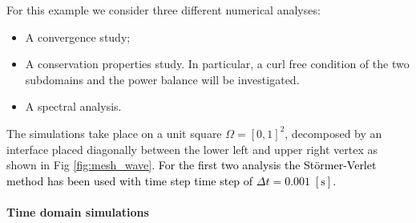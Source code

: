 \documentclass[11pt,a4paper]{article}
\newcommand{\revone}[1]{{\textcolor{black}{#1}}}
\begin{document}
For this example we consider three different numerical analyses:
\begin{itemize}
    \item A convergence study;
    \item A conservation properties study. In particular, a curl free condition of the two subdomains and the power balance will be investigated.
    \item A spectral analysis.
\end{itemize}
The simulations take place on a unit square $\Omega=[0, 1]^2$, decomposed by an interface placed diagonally between the lower left and upper right vertex as shown in Fig \ref{fig:mesh_wave}. \revone{For the first two analysis the St\"ormer-Verlet method has been used with time step time step of $\Delta t=0.001 \; \mathrm{[s]}$.}

\paragraph{Time domain simulations}
\end{document}
